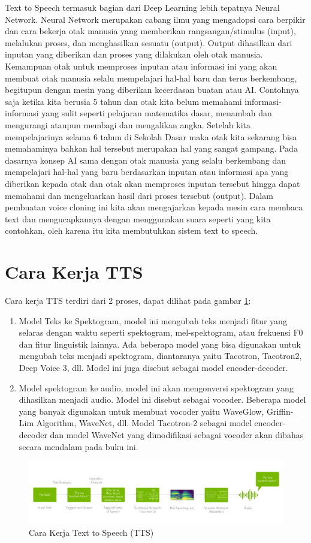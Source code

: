 Text to Speech termasuk bagian dari Deep Learning lebih tepatnya Neural Network. Neural Network merupakan cabang ilmu yang mengadopsi cara berpikir dan cara bekerja otak manusia yang memberikan rangsangan/stimulus (input), melalukan proses, dan menghasilkan sesuatu (output). Output dihasilkan dari inputan yang diberikan dan proses yang dilakukan oleh otak manusia. Kemampuan otak untuk memproses inputan atau informasi ini yang akan membuat otak manusia selalu mempelajari hal-hal baru dan terus berkembang, begitupun dengan mesin yang diberikan kecerdasan buatan atau AI. Contohnya saja ketika kita berusia 5 tahun dan otak kita belum memahami informasi-informasi yang sulit seperti pelajaran matematika dasar, menambah dan mengurangi ataupun membagi dan mengalikan angka. Setelah kita mempelajarinya selama 6 tahun di Sekolah Dasar maka otak kita sekarang bisa memahaminya bahkan hal tersebut merupakan hal yang sangat gampang. Pada dasarnya konsep AI sama dengan otak manusia yang selalu berkembang dan mempelajari hal-hal yang baru berdasarkan inputan atau informasi apa yang diberikan kepada otak dan otak akan memproses inputan tersebut hingga dapat memahami dan mengeluarkan hasil dari proses tersebut (output).
Dalam pembuatan voice cloning ini kita akan mengajarkan kepada mesin cara membaca text dan mengucapkannya dengan menggunakan suara seperti yang kita contohkan, oleh karena itu kita membutuhkan sistem text to speech.


\section{Cara Kerja TTS}
Cara kerja TTS terdiri dari 2 proses, dapat dilihat pada gambar \ref{cara kerja}:
\begin{enumerate}
\item Model Teks ke Spektogram, model ini mengubah teks menjadi fitur yang selaras dengan waktu seperti spektogram, mel-spektogram, atau frekuensi F0 dan fitur linguistik lainnya. Ada beberapa model yang bisa digunakan untuk mengubah teks menjadi spektogram, diantaranya yaitu Tacotron, Tacotron2, Deep Voice 3, dll. Model ini juga disebut sebagai model encoder-decoder.
\item Model spektogram ke audio, model ini akan mengonversi spektogram yang dihasilkan menjadi audio. Model ini disebut sebagai vocoder. Beberapa model yang banyak digunakan untuk membuat vocoder yaitu WaveGlow, Griffin-Lim Algorithm, WaveNet, dll.
Model Tacotron-2 sebagai model encoder-decoder dan model WaveNet yang dimodifikasi sebagai vocoder akan dibahas secara mendalam pada buku ini.
\end{enumerate}
\begin{figure}[H]
        \centerline{\includegraphics[scale=.40]{figures/cara_kerja_tts}}
        \caption{Cara Kerja Text to Speech (TTS)}
		\label{cara kerja}
\end{figure}
